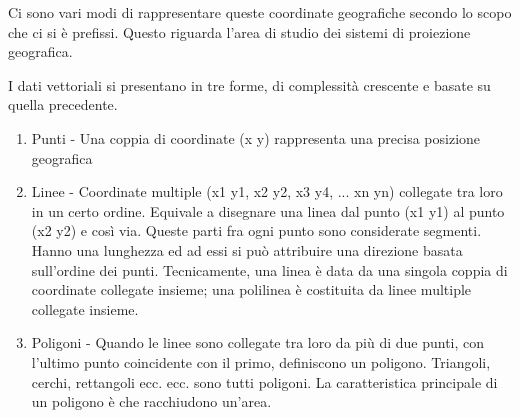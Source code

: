 Ci sono vari modi di rappresentare queste coordinate geografiche secondo
lo scopo che ci si è prefissi. Questo riguarda l'area di studio dei
sistemi di proiezione geografica.

I dati vettoriali si presentano in tre forme, di complessità crescente
e basate su quella precedente.
\begin{enumerate}
\item Punti - Una coppia di coordinate (x y) rappresenta una precisa posizione geografica
\item Linee - Coordinate multiple (x1 y1, x2 y2, x3 y4, ... xn yn) collegate
tra loro in un certo ordine. Equivale a disegnare una linea dal punto (x1 y1)
al punto (x2 y2) e così via. Queste parti fra ogni punto sono considerate segmenti.
Hanno una lunghezza ed ad essi si può attribuire una direzione basata sull’ordine
dei punti. Tecnicamente, una linea è data da una singola coppia di coordinate
collegate insieme; una polilinea è costituita da linee multiple collegate insieme.
\item Poligoni - Quando le linee sono collegate tra loro da più di due punti,
con l'ultimo punto coincidente con il primo, definiscono un poligono.
Triangoli, cerchi, rettangoli ecc. ecc. sono tutti poligoni. La caratteristica
principale di un poligono è che racchiudono un'area. 
\end{enumerate}

